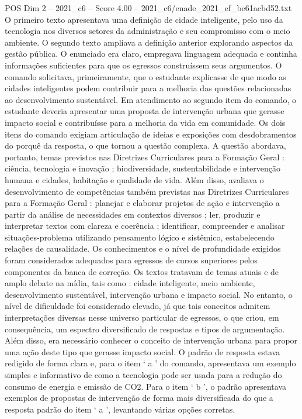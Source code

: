 \begin{textsample}{POS Dim 2 – 2021\_c6 – Score 4.00 – 2021\_c6/enade\_2021\_ef\_be61acbd52.txt}
O primeiro texto apresentava uma definição de cidade inteligente, pelo uso da tecnologia nos diversos setores da administração e seu compromisso com o meio ambiente.
O segundo texto ampliava a definição anterior explorando aspectos da gestão pública.
O enunciado era claro, empregava linguagem adequada e continha informações suficientes para que os egressos construíssem seus argumentos.
O comando solicitava, primeiramente, que o estudante explicasse de que modo as cidades inteligentes podem contribuir para a melhoria das questões relacionadas ao desenvolvimento sustentável.
Em atendimento ao segundo item do comando, o estudante deveria apresentar uma proposta de intervenção urbana que gerasse impacto social e contribuísse para a melhoria da vida em comunidade.
Os dois itens do comando exigiam articulação de ideias e exposições com desdobramentos do porquê da resposta, o que tornou a questão complexa.
A questão abordava, portanto, temas previstos nas Diretrizes Curriculares para a Formação Geral : ciência, tecnologia e inovação ; biodiversidade, sustentabilidade e intervenção humana e cidades, habitação e qualidade de vida.
Além disso, avaliava o desenvolvimento de competências também previstas nas Diretrizes Curriculares para a Formação Geral : planejar e elaborar projetos de ação e intervenção a partir da análise de necessidades em contextos diversos ; ler, produzir e interpretar textos com clareza e coerência ; identificar, compreender e analisar situações-problema utilizando pensamento lógico e sistêmico, estabelecendo relações de causalidade.
Os conhecimentos e o nível de profundidade exigidos foram considerados adequados para egressos de cursos superiores pelos componentes da banca de correção.
Os textos tratavam de temas atuais e de amplo debate na mídia, tais como : cidade inteligente, meio ambiente, desenvolvimento sustentável, intervenção urbana e impacto social.
No entanto, o nível de dificuldade foi considerado elevado, já que tais conceitos admitem interpretações diversas nesse universo particular de egressos, o que criou, em consequência, um espectro diversificado de respostas e tipos de argumentação.
Além disso, era necessário conhecer o conceito de intervenção urbana para propor uma ação deste tipo que gerasse impacto social.
O padrão de resposta estava redigido de forma clara e, para o item ‘ a ’ do comando, apresentava um exemplo simples e informativo de como a tecnologia pode ser usada para a redução do consumo de energia e emissão de CO2.
Para o item ‘ b ’, o padrão apresentava exemplos de propostas de intervenção de forma mais diversificada do que a resposta padrão do item ‘ a ’, levantando várias opções corretas.

\end{textsample}
